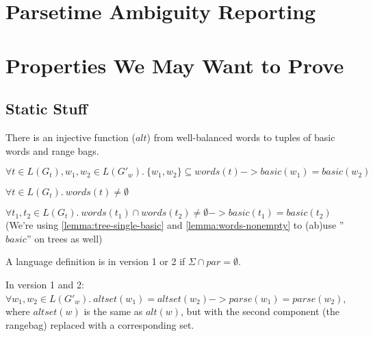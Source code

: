 \documentclass[acmsmall,review,anonymous]{acmart}\settopmatter{printfolios=true,printccs=false,printacmref=false}
\newcommand{\T}{\Sigma} %
\newcommand{\parse}{\mathit{parse}} %
\newcommand{\words}{\mathit{words}} %
\newcommand{\alt}{\mathit{alt}} %
\newcommand{\basic}{\mathit{basic}} %
\newcommand{\altset}{\mathit{altset}} %
\begin{document}
\clearpage


\section{Parsetime Ambiguity Reporting} \label{sec:parse-time-reporting}

\section{Properties We May Want to Prove}

\subsection{Static Stuff}

\begin{lemma}
There is an injective function ($\alt$) from well-balanced words to tuples of basic words and range bags.
\end{lemma}

\begin{lemma}
$\forall t \in L(G_t), w_1, w_2 \in L(G'_w).\ \{w_1, w_2\} \subseteq \words(t) -> \basic(w_1) = \basic(w_2)$
\label{lemma:tree-single-basic}
\end{lemma}

\begin{lemma}
$\forall t \in L(G_t).\ \words(t) \neq \emptyset$
\label{lemma:words-nonempty}
\end{lemma}

\begin{lemma}
$\forall t_1, t_2 \in L(G_t).\ \words(t_1) \cap \words(t_2) \neq \emptyset -> \basic(t_1) = \basic(t_2)$ \\
(We're using \ref{lemma:tree-single-basic} and \ref{lemma:words-nonempty} to (ab)use ''$\basic$'' on trees as well)
\end{lemma}

\begin{definition}
A language definition is in version 1 or 2 if $\T \cap \mathit{par} = \emptyset$.
\end{definition}

\begin{theorem}
In version 1 and 2: $\forall w_1, w_2 \in L(G'_w).\ \altset(w_1) = \altset(w_2) -> \parse(w_1) = \parse(w_2)$, where $\altset(w)$ is the same as $\alt(w)$, but with the second component (the rangebag) replaced with a corresponding set.
\end{theorem}
\end{document}
